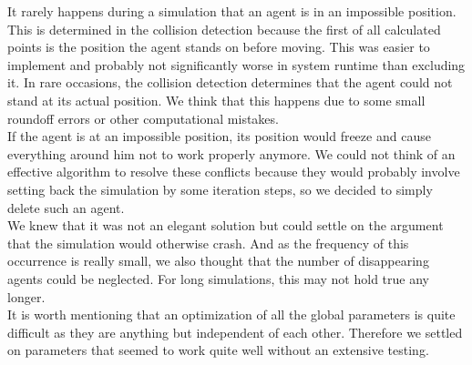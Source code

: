 \noi It rarely happens during a simulation that an agent is in an impossible position. This is determined in the collision detection because the first of all calculated points is the position the agent stands on before moving. This was easier to implement and probably not significantly worse in system runtime than excluding it. In rare occasions, the collision detection determines that the agent could not stand at its actual position. We think that this happens due to some small roundoff errors or other computational mistakes.\\
If the agent is at an impossible position, its position would freeze and cause everything around him not to work properly anymore. We could not think of an effective algorithm to resolve these conflicts because they would probably involve setting back the simulation by some iteration steps, so we decided to simply delete such an agent.\\
We knew that it was not an elegant solution but could settle on the argument that the simulation would otherwise crash. And as the frequency of this occurrence is really small, we also thought that the number of disappearing agents could be neglected. For long simulations, this may not hold true any longer.\\

It is worth mentioning that an optimization of all the global parameters is quite difficult as they are anything but independent of each other. Therefore we settled on parameters that seemed to work quite well without an extensive testing.


